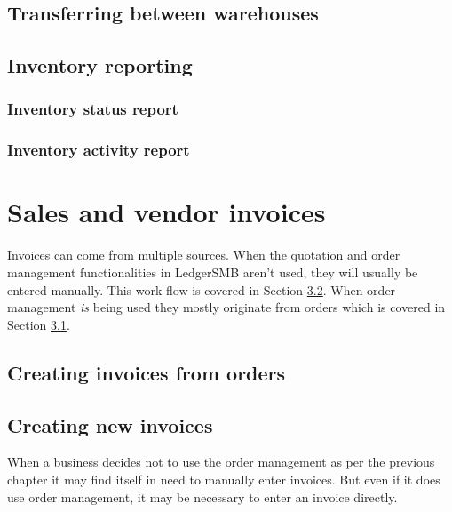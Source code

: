 \section{Transferring between warehouses}

\section{Inventory reporting}

\subsection{Inventory status report}

\subsection{Inventory activity report}




\chapter{Sales and vendor invoices}
\label{cha-invoicing}

Invoices can come from multiple sources. When the quotation and order
management functionalities in LedgerSMB aren't used, they will usually
be entered manually. This work flow is covered in Section
\ref{sec:ManuallyCreatingInvoices}.
When order management \emph{is} being used they mostly originate from orders
which is covered in Section \ref{sec:InvoicesFromOrders}.



\section{Creating invoices from orders}
\label{sec:InvoicesFromOrders}





\section{Creating new invoices}
\label{sec:ManuallyCreatingInvoices}



When a business decides not to use the order management as per the previous
chapter it may find itself in need to manually enter invoices. But even
if it does use order management, it may be necessary to enter an invoice
directly.


